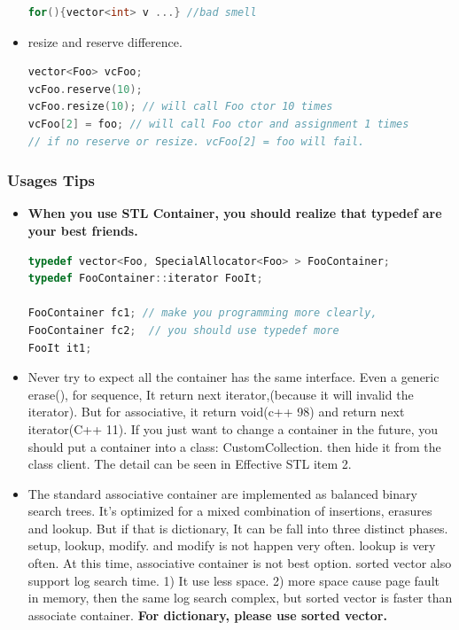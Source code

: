 \documentclass[a4paper,11pt,twoside]{book}
\begin{document}
\begin{itemize}
\begin{lstlisting}[frame=single, language=c++]
for(){vector<int> v ...} //bad smell
\end{lstlisting}
\item resize and reserve difference.
\begin{lstlisting}[frame=single, language=c++]
vector<Foo> vcFoo;
vcFoo.reserve(10);
vcFoo.resize(10); // will call Foo ctor 10 times
vcFoo[2] = foo; // will call Foo ctor and assignment 1 times
// if no reserve or resize. vcFoo[2] = foo will fail.
\end{lstlisting}


\end{itemize}

\subsubsection{Usages Tips}
\begin{itemize}

\item \textbf{When you use STL Container, you should realize that typedef are your best friends.}
\begin{lstlisting}[frame=single, language=c++]
typedef vector<Foo, SpecialAllocator<Foo> > FooContainer;
typedef FooContainer::iterator FooIt;

FooContainer fc1; // make you programming more clearly,
FooContainer fc2;  // you should use typedef more
FooIt it1;
\end{lstlisting}


\item Never try to expect all the container has the same interface. Even a generic erase(), for sequence, It return next iterator,(because it will invalid the iterator).   But for associative, it return void(c++ 98) and return next iterator(C++ 11). If you just want to change a container in the future, you should put a container into a class: CustomCollection. then hide it from the class client. The detail can be seen in Effective STL item 2.

\item The standard associative container are implemented as balanced binary search trees.  It's optimized for a mixed combination of insertions, erasures and lookup.  But if that is dictionary, It can be fall into three distinct phases. setup, lookup, modify. and modify is not happen very often. lookup is very often. At this time, associative container is not best option. sorted vector also support log search time.  1) It use less space. 2) more space cause page fault in memory, then the same log search complex, but sorted vector is faster than associate container.\textbf{ For dictionary, please use sorted vector.}



\end{itemize}
\end{document}
